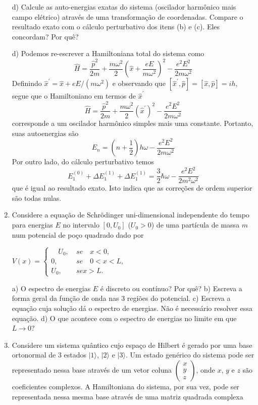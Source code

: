 \begin{enumerate}[start=1,label={\bfseries Q\arabic*.}]
d) Calcule as auto-energias exatas do sistema (oscilador harmônico mais campo elétrico) através de uma transformação de coordenadas. Compare o resultado exato com o cálculo perturbativo dos itens (b) e (c). Eles concordam? Por quê?

\resposta d) Podemos re-escrever a Hamiltoniana total do sistema como
$$
\hat{H}=\frac{\hat{p}^{2}}{2 m}+\frac{m \omega^{2}}{2}\left(\hat{x}+\frac{e E}{m \omega^{2}}\right)^{2}-\frac{e^{2} E^{2}}{2 m \omega^{2}}
$$
Definindo $\hat{x}^{\prime}=\hat{x}+e E /\left(m \omega^{2}\right)$ e observando que $\left[\hat{x}^{\prime}, \hat{p}\right]=[\hat{x}, \hat{p}]=i h,$ segue que o Hamiltoniano em termos de $\hat{x}^{\prime}$
$$
\hat{H}=\frac{\hat{p}^{2}}{2 m}+\frac{m \omega^{2}}{2}\left(\hat{x}^{\prime}\right)^{2}-\frac{e^{2} E^{2}}{2 m \omega^{2}}
$$
corresponde a um oscilador harmônico simples mais uma constante. Portanto, suas autoenergias são
$$
E_{n}=\left(n+\frac{1}{2}\right) h \omega-\frac{e^{2} E^{2}}{2 m \omega^{2}}
$$
Por outro lado, do cálculo perturbativo temos
$$
E_{1}^{(0)}+\Delta E_{1}^{(1)}+\Delta E_{1}^{(1)}=\frac{3}{2} \hbar \omega-\frac{e^{2} E^{2}}{2 m^{2} \omega^{2}}
$$
que é igual ao resultado exato. Isto indica que as correções de ordem superior são todas nulas.







\item Considere a equação de Schrödinger uni-dimensional independente do tempo para energias $E$ no intervalo $[0,U_{0}]$ ($U_{0} > 0$) de uma partícula de massa $m$ num potencial de poço quadrado dado por

\begin{center}
$V(x) = \left\{\begin{array}{cc} \quad U_{0},& \ se \quad x < 0, \\ 0,& \ se \quad 0 < x < L, \\ U_{0} ,& \ se x > L. \end{array}\right.$
\end{center}


a) O espectro de energias $E$ é discreto ou contínuo? Por quê?
b) Escreva a forma geral da função de onda nas 3 regiões do potencial.
c) Escreva a equação cuja solução dá o espectro de energias. Não é necessário resolver essa equação.
d) O que acontece com o espectro de energias no limite em que $L \rightarrow 0$?




\item Considere um sistema quântico cujo espaço de Hilbert é gerado por uma base ortonormal de 3 estados $|1\rangle$, $|2\rangle$ e $|3\rangle$. Um estado genérico do sistema pode ser representado nessa base através de um vetor coluna $ \left( \begin{array}{ccc} x \\ y \\ z  \end{array} \right) $, onde $x$, $y$ e $z$ são coeficientes complexos. A Hamiltoniana do sistema, por sua vez, pode ser representada nessa mesma base através de uma matriz quadrada complexa


\end{enumerate}

